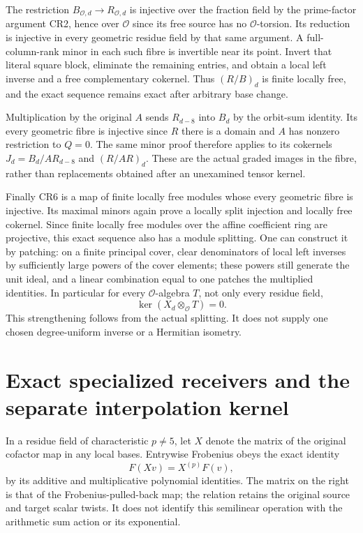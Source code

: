 The restriction $B_{\mathcal O,d}\to R_{\mathcal O,d}$ is
injective over the fraction field by the prime-factor argument
CR2, hence over $\mathcal O$ since its free source has no
$\mathcal O$-torsion.  Its reduction is injective in every geometric
residue field by that same argument.  A full-column-rank minor
in each such fibre is invertible near its point.  Invert that
literal square block, eliminate the remaining entries, and obtain
a local left inverse and a free complementary cokernel.  Thus
$(R/B)_d$ is finite locally free, and the exact sequence remains
exact after arbitrary base change.

Multiplication by the original $A$ sends $R_{d-8}$ into $B_d$
by the orbit-sum identity.  Its every geometric fibre is injective
since $R$ there is a domain and $A$ has nonzero restriction to
$Q=0$.  The same minor proof therefore applies to its cokernels
$J_d=B_d/A R_{d-8}$ and $(R/AR)_d$.  These are the actual graded
images in the fibre, rather than replacements obtained after
an unexamined tensor kernel.

Finally CR6 is a map of finite locally free modules whose every
geometric fibre is injective.  Its maximal minors again prove
a locally split injection and locally free cokernel.  Since
finite locally free modules over the affine coefficient ring are
projective, this exact sequence also has a module splitting.
One can construct it by patching: on a finite principal cover,
clear denominators of local left inverses by sufficiently large
powers of the cover elements; these powers still generate the
unit ideal, and a linear combination equal to one patches the
multiplied identities.  In particular for every $\mathcal O$-algebra
$T$, not only every residue field,
\[
 \ker(X_d\otimes_\mathcal O T)=0.                              \tag{CR24}
\]
This strengthening follows from the actual splitting.  It does
not supply one chosen degree-uniform inverse or a Hermitian
isometry.

\section{Exact specialized receivers and the separate interpolation kernel}
In a residue field of characteristic $p\ne5$, let $X$ denote
the matrix of the original cofactor map in any local bases.
Entrywise Frobenius obeys the exact identity
\[
 F(Xv)=X^{(p)}F(v),                                             \tag{CR25}
\]
by its additive and multiplicative polynomial identities.  The
matrix on the right is that of the Frobenius-pulled-back map;
the relation retains the original source and target scalar twists.
It does not identify this semilinear operation with the arithmetic
sum action or its exponential.

